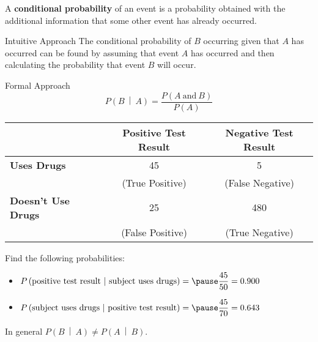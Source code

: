 \documentclass{beamer}
\newcommand{\prob}[1]{P\left(#1\right)}
\newcommand{\condprob}[2]{\prob{#1~\middle|~#2}}
\begin{document}
\begin{frame}
\begin{definition}
A \textbf{conditional probability} of an event is a probability obtained with the additional information that some other event has already occurred.
\end{definition}\pause

\begin{block}{Intuitive Approach}
The conditional probability of $B$ occurring given that $A$ has occurred can be found by assuming that event $A$ has occurred and then calculating the probability that event $B$ will occur. 
\end{block}\pause

\begin{block}{Formal Approach}
\begin{equation*}
\condprob{B}{A}=\dfrac{\prob{A~\text{and}~B}}{\prob{A}}
\end{equation*}
\end{block}
\end{frame}

\begin{frame}
\begin{example}
\begin{center}
\begin{tabular}{|l|c|c|}\hline
&\textbf{Positive Test Result} & \textbf{Negative Test Result} \\\hline
\textbf{Uses Drugs} & 45 & 5 \\
&(True Positive)&(False Negative)\\\hline
\textbf{Doesn't Use Drugs} & 25 & 480\\
&(False Positive) & (True Negative)\\\hline
\end{tabular}
\end{center}
Find the following probabilities:
\begin{itemize}
\item $\condprob{\text{positive test result}}{\text{subject uses drugs}}=\pause\dfrac{45}{50}=0.900$\pause
\item $\condprob{\text{subject uses drugs}}{\text{positive test result}}=\pause\dfrac{45}{70}=0.643$
\end{itemize}
\end{example}\pause

\begin{note}
In general $\condprob{B}{A}\neq\condprob{A}{B}$.
\end{note}
\end{frame}
\end{document}

